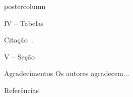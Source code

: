 \documentclass[final,hyperref={pdfpagelabels=false}]{beamer}
\begin{document}
\begin{frame}
\begin{columns}
\begin{column}{.54\textwidth}
\begin{beamercolorbox}[center,wd=\textwidth]{postercolumn}
\begin{minipage}[T]{.95\textwidth}
{\begin{block}{\vspace{-6pt} \large IV -- Tabelas}
							\vspace*{14pt}
														
							\begin{itemize}
																
								{\small \item Citação~\cite{jia2014caffe}.}
																
							\end{itemize}
														
														
						\end{block}
												
						\vspace*{8pt}
												
						\begin{block}{\vspace{-6pt} \large V -- Seção}
						\end{block}
												
						\vspace*{8pt}
												
						\begin{block}{\vspace{-6pt} \large Agradecimentos}
							{\small Os autores agradecem...}
						\end{block}	
												
						\vspace*{8pt}
												
						\begin{block}{\vspace{-6pt} \large Referências}
							{\tiny
								
								}
						\end{block}
												
						\vspace*{8pt}
												
												
												
					}
				\end{minipage}
			\end{beamercolorbox}
		\end{column}
	\end{columns}
\end{frame}
\end{document}
